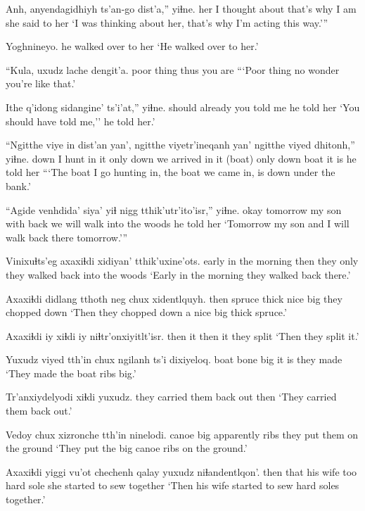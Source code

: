 \documentclass[12pt]{article}
\begin{document}
\gll Anh, {anyendagidhiyh}     {ts'an-go}     dist'a,'' yiɬne.
her  {I thought about} {that's why} {I am}   {she said to her}
\glt `I was thinking about her, that's why I'm acting this way.'''
\glend

\gll Yoghnineyo.
{{he walked over to her}}
\glt `He walked over to her.'
\glend

\gll ``Kula,      uxudz lache dengit'a.
{poor thing} thus {} {you are}
\glt ```Poor thing no wonder you're like that.'
\glend

\gll Ithe   q'idong sidangine' ts'i'at,'' yiɬne.
should {already} {you told me} {} {he told her}
\glt `You should have told me,'' he told her.'
\glend

\gll ``Ngitthe {viye in dist'an} yan', ngitthe {viyetr'ineqanh} yan' ngitthe viyed dhitonh,'' yiɬne.
down    {I hunt in it}   only  down    {we arrived in it (boat)}  only down  boat  {it is} {he told her}
\glt ```The boat I go hunting in, the boat we came in, is down under the bank.'
\glend

\gll ``Agide venhdida' siya'  yiɬ  nigg  tthik'utr'ito'isr,'' yiɬne.
okay  tomorrow  {my son} with back {we will walk into the woods} {he told her}
\glt `Tomorrow my son and I will walk back there tomorrow.'''
\glend

\gll Vinixuɬts'eg          axaxiɬdi xidiyan'  tthik'uxine'ots.
{early in the morning} then   {they only} {they walked back into the woods}
\glt `Early in the morning they walked back there.'
\glend

\gll Axaxiɬdi didlang tthoth neg chux xidentlquyh.
then     spruce  thick  nice big {they chopped down}
\glt `Then they chopped down a nice big thick spruce.'
\glend

\gll Axaxiɬdi iy xiɬdi iy niɬtr'onxiyitlt'isr.
then     it then it {they split}
\glt `Then they split it.'
\glend

\gll Yuxudz viyed tth'in chux ngilanh ts'i dixiyeloq.
{}    boat bone   big  {it is} {} {they made}
\glt `They made the boat ribs big.'
\glend

\gll Tr'anxiydelyodi xiɬdi yuxudz.
{they carried them back out}  then {}  
\glt `They carried them back out.'
\glend

\gll Vedoy chux xizronche tth'in ninelodi.
canoe big    apparently     ribs   {they put them on the ground}
\glt `They put the big canoe ribs on the ground.'
\glend

\gll Axaxiɬdi yiggi vu'ot    chechenh qalay     yuxudz niɬandentlqon'.
then   that  {his wife} too    {hard sole} {}   {she started to sew together}
\glt `Then his wife started to sew hard soles together.'
\glend
\end{document}
